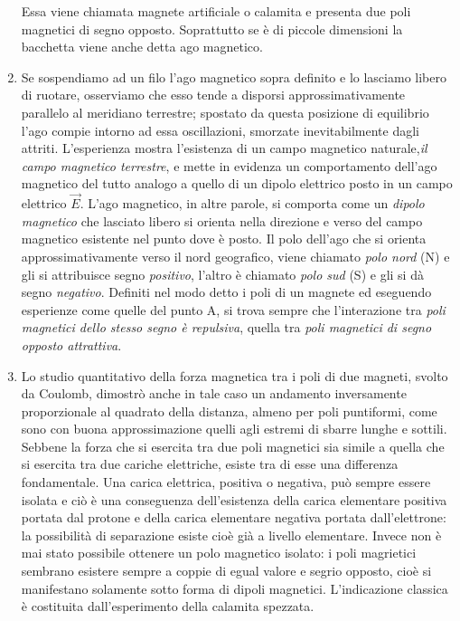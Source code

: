 \documentclass[class=book, crop=false, oneside, 12pt]{standalone}
\begin{document}
\begin{enumerate}
    Essa viene chiamata magnete artificiale o calamita e presenta due poli magnetici di segno opposto. 
    Soprattutto se è di piccole dimensioni la bacchetta viene anche detta ago magnetico. 
    \item Se sospendiamo ad un filo l'ago magnetico sopra definito e lo lasciamo libero di ruotare, osserviamo che esso tende a disporsi approssimativamente parallelo al meridiano terrestre; spostato da questa posizione di equilibrio l'ago compie intorno ad essa oscillazioni, smorzate inevitabilmente dagli attriti. 
    L'esperienza mostra l'esistenza di un campo magnetico naturale,\emph{il campo magnetico terrestre}, e mette in evidenza un comportamento dell'ago magnetico del tutto analogo a quello di un dipolo elettrico posto in un campo elettrico \(\overrightarrow{E}\). 
    L'ago magnetico, in altre parole, si comporta come un \emph{dipolo magnetico} che lasciato libero si orienta nella direzione e verso del campo magnetico esistente nel punto dove è posto. 
    Il polo dell'ago che si orienta approssimativamente verso il nord geografico, viene chiamato \emph{polo nord} (N) e  gli si attribuisce segno \emph{positivo}, l'altro è chiamato \emph{polo sud} (S) e  gli si dà segno \emph{negativo}. 
    Definiti nel modo detto i poli di un magnete ed eseguendo esperienze come quelle del punto A, si trova sempre che l'interazione tra \emph{poli magnetici dello stesso segno è repulsiva}, quella tra \emph{poli magnetici di segno opposto attrattiva}.
    \item Lo studio quantitativo della forza magnetica tra i poli di due magneti, svolto da Coulomb, dimostrò anche in tale caso un andamento inversamente proporzionale al quadrato della distanza, almeno per poli puntiformi, come sono con buona approssimazione quelli agli estremi di sbarre lunghe e sottili. 
    Sebbene la forza che si esercita tra due poli magnetici sia simile a quella che si esercita tra due cariche elettriche, esiste tra di esse una differenza fondamentale. 
    Una carica elettrica, positiva o negativa, può sempre essere isolata e ciò è una conseguenza dell'esistenza della carica elementare positiva portata dal protone e della carica elementare negativa portata dall'elettrone: la possibilità di separazione esiste cioè già a livello elementare. 
    Invece non è mai stato possibile ottenere un polo magnetico isolato: i poli magrietici sembrano esistere sempre a coppie di egual valore e segrio opposto, cioè si manifestano solamente sotto forma di dipoli magnetici. 
    L'indicazione classica è costituita dall'esperimento della calamita spezzata. 

\end{enumerate}
\end{document}
